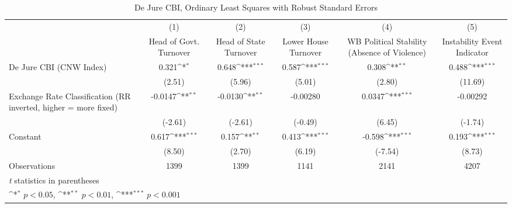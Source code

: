 \begin{table}[htbp]\centering
\def\sym#1{\ifmmode^{#1}\else\(^{#1}\)\fi}
\caption{De Jure CBI, Ordinary Least Squares with Robust Standard Errors \label{multIndOLSDJ}}
\begin{tabular*}{\linewidth}{@{\hskip\tabcolsep\extracolsep\fill}l*{5}{c}}
\toprule
                &\multicolumn{1}{c}{(1)}&\multicolumn{1}{c}{(2)}&\multicolumn{1}{c}{(3)}&\multicolumn{1}{c}{(4)}&\multicolumn{1}{c}{(5)}\\
                &\multicolumn{1}{c}{Head of Govt. Turnover}&\multicolumn{1}{c}{Head of State Turnover}&\multicolumn{1}{c}{Lower House Turnover}&\multicolumn{1}{c}{WB Political Stability (Absence of Violence)}&\multicolumn{1}{c}{Instability Event Indicator}\\
\midrule
De Jure CBI (CNW Index)&    0.321\sym{*}  &    0.648\sym{***}&    0.587\sym{***}&    0.308\sym{**} &    0.488\sym{***}\\
                &   (2.51)         &   (5.96)         &   (5.01)         &   (2.80)         &  (11.69)         \\
\addlinespace
Exchange Rate Classification (RR inverted, higher = more fixed)&  -0.0147\sym{**} &  -0.0130\sym{**} & -0.00280         &   0.0347\sym{***}& -0.00292         \\
                &  (-2.61)         &  (-2.61)         &  (-0.49)         &   (6.45)         &  (-1.74)         \\
\addlinespace
Constant        &    0.617\sym{***}&    0.157\sym{**} &    0.413\sym{***}&   -0.598\sym{***}&    0.193\sym{***}\\
                &   (8.50)         &   (2.70)         &   (6.19)         &  (-7.54)         &   (8.73)         \\
\midrule
Observations    &     1399         &     1399         &     1141         &     2141         &     4207         \\
\bottomrule
\multicolumn{6}{l}{\footnotesize \textit{t} statistics in parentheses}\\
\multicolumn{6}{l}{\footnotesize \sym{*} \(p<0.05\), \sym{**} \(p<0.01\), \sym{***} \(p<0.001\)}\\
\end{tabular*}
\end{table}
